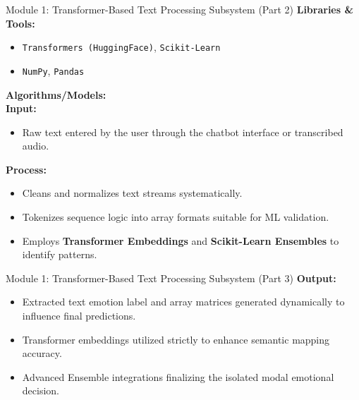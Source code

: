 \documentclass[11pt]{beamer}
\begin{document}
\begin{frame}{Module 1: Transformer-Based Text Processing Subsystem (Part 2)}
\textbf{Libraries \& Tools:}
\begin{itemize}
    \item \texttt{Transformers (HuggingFace)}, \texttt{Scikit-Learn}
    \item \texttt{NumPy}, \texttt{Pandas}
\end{itemize}

\vspace{0.3cm}
\textbf{Algorithms/Models:}
\\
\textbf{Input:}
\begin{itemize}
    \item Raw text entered by the user through the chatbot interface or transcribed audio.
\end{itemize}

\textbf{Process:}
\begin{itemize}
    \item Cleans and normalizes text streams systematically.
    \item Tokenizes sequence logic into array formats suitable for ML validation.
    \item Employs \textbf{Transformer Embeddings} and \textbf{Scikit-Learn Ensembles} to identify patterns.
\end{itemize}
\end{frame}
\begin{frame}{Module 1: Transformer-Based Text Processing Subsystem (Part 3)}
\textbf{Output:}
\begin{itemize}
    \item Extracted text emotion label and array matrices generated dynamically to influence final predictions.
\end{itemize}
\begin{itemize}
    \item Transformer embeddings utilized strictly to enhance semantic mapping accuracy.
    \item Advanced Ensemble integrations finalizing the isolated modal emotional decision.
\end{itemize}
\end{frame}
\end{document}
